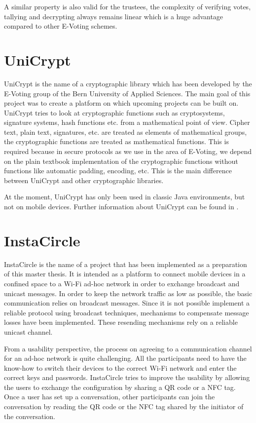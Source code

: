 \documentclass[numbers=noenddot, abstract=on, a4paper, headsepline,
footsepline, oneside, draft=off]{scrreprt}
\begin{document}
A similar property is also valid for the trustees, the complexity of verifying
votes, tallying and decrypting always remains linear which is a huge advantage
compared to other E-Voting schemes.


\section{UniCrypt}
\label{sec:unicrypt}
UniCrypt is the name of a cryptographic library which has been developed by the
E-Voting group of the Bern University of Applied Sciences. The main goal of this
project was to create a platform on which upcoming projects can be built on.
UniCrypt tries to look at cryptographic functions such as cryptosystems,
signature systems, hash functions etc. from a mathematical point of view. Cipher
text, plain text, signatures, etc. are treated as elements of mathematical
groups, the cryptographic functions are treated as mathematical functions. This
is required because in secure protocols as we use in the area of E-Voting, we
depend on the plain textbook implementation of the cryptographic functions
without functions like automatic padding, encoding, etc. This is the main
difference between UniCrypt and other cryptographic libraries.

At the moment, UniCrypt has only been used in classic Java environments, but not
on mobile devices. Further information about UniCrypt can be found in
\cite{ritter12}.

\section{InstaCircle}
\label{sec:instacircle}
InstaCircle is the name of a project that has been implemented as a preparation
of this master thesis. It is intended as a platform to connect mobile devices
in a confined space to a Wi-Fi ad-hoc network in order to exchange broadcast
and unicast messages. In order to keep the network traffic as low as possible,
the basic communication relies on broadcast messages. Since it is not possible
implement a reliable protocol using broadcast techniques, mechanisms to
compensate message losses have been implemented. These resending mechanisms rely
on a reliable unicast channel.

From a usability perspective, the process on agreeing to a communication channel
for an ad-hoc network is quite challenging. All the participants need to have
the know-how to switch their devices to the correct Wi-Fi network and enter the
correct keys and passwords. InstaCircle tries to improve the usability by
allowing the users to exchange the configuration by sharing a QR code or a NFC
tag. Once a user has set up a conversation, other participants can join the
conversation by reading the QR code or the NFC tag shared by the initiator of
the conversation.
\end{document}
